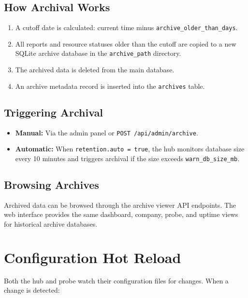 \documentclass[12pt]{report}
\begin{document}
\subsection{How Archival Works}

\begin{enumerate}
    \item A cutoff date is calculated: current time minus
          \texttt{archive\_older\_than\_days}.
    \item All reports and resource statuses older than the cutoff are copied to
          a new SQLite archive database in the \texttt{archive\_path}
          directory.
    \item The archived data is deleted from the main database.
    \item An archive metadata record is inserted into the \texttt{archives}
          table.
\end{enumerate}

\subsection{Triggering Archival}

\begin{itemize}
    \item \textbf{Manual:} Via the admin panel or
          \texttt{POST /api/admin/archive}.
    \item \textbf{Automatic:} When \texttt{retention.auto = true}, the hub
          monitors database size every 10 minutes and triggers archival if the
          size exceeds \texttt{warn\_db\_size\_mb}.
\end{itemize}

\subsection{Browsing Archives}

Archived data can be browsed through the archive viewer API endpoints. The web
interface provides the same dashboard, company, probe, and uptime views for
historical archive databases.

\section{Configuration Hot Reload}

Both the hub and probe watch their configuration files for changes. When a
change is detected:
\end{document}
